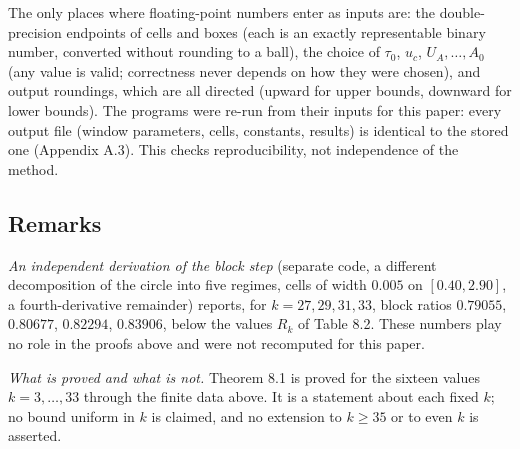 The only places where floating-point numbers enter as inputs are: the double-precision endpoints of cells and boxes (each is an exactly representable binary number, converted without rounding to a ball), the choice of \(\tau_0\), \(u_c\), \(U_A,\dots,A_0\) (any value is valid; correctness never depends on how they were chosen), and output roundings, which are all directed (upward for upper bounds, downward for lower bounds). The programs were re-run from their inputs for this paper: every output file (window parameters, cells, constants, results) is identical to the stored one (Appendix A.3). This checks reproducibility, not independence of the method.

\subsection{Remarks}\label{remarks}

\emph{An independent derivation of the block step} (separate code, a different decomposition of the circle into five regimes, cells of width \(0.005\) on \([0.40,2.90]\), a fourth-derivative remainder) reports, for \(k=27,29,31,33\), block ratios \(0.79055\), \(0.80677\), \(0.82294\), \(0.83906\), below the values \(R_k\) of Table 8.2. These numbers play no role in the proofs above and were not recomputed for this paper.

\emph{What is proved and what is not.} Theorem 8.1 is proved for the sixteen values \(k=3,\dots,33\) through the finite data above. It is a statement about each fixed \(k\); no bound uniform in \(k\) is claimed, and no extension to \(k\ge35\) or to even \(k\) is asserted.
